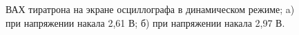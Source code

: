 \begin{enumerate}
		\begin{figure}[h!]
			\begin{minipage}[h]{0.49\linewidth}
			\end{minipage}
			\hfill
			\begin{minipage}[h]{0.49\linewidth}
			\end{minipage}
			\caption{ВАХ тиратрона на экране осциллографа в динамическом режиме; a) при напряжении накала 2,61 В; б) при напряжении накала 2,97 В.}
		\end{figure}
	

\end{enumerate}
